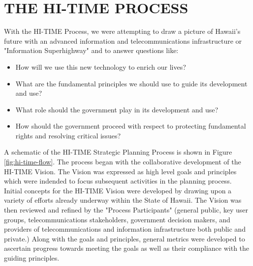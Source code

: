 
\section{THE HI-TIME PROCESS}


With the HI-TIME Process, we were attempting to draw a picture of 
Hawaii's future with an advanced information and telecommunications 
infrastructure or "Information Superhighway" and to answer questions 
like:

\begin{itemize}
\item How will we use this new technology to enrich our lives?

\item What are the fundamental principles we should use to guide its 
development and use?

\item What role should the government play in its development and use?

\item How should the government proceed with respect to protecting 
fundamental rights and resolving critical issues?

\end{itemize}

A schematic of the HI-TIME Strategic Planning Process is shown in Figure
\ref{fig:hi-time-flow}.  The process began with the collaborative
development of the HI-TIME Vision.  The Vision was expressed as high level
goals and principles which were indended to focus subsequent activities in the
planning process.  Initial concepts for the HI-TIME Vision were developed by
drawing upon a variety of efforts already underway within the State of
Hawaii.  The Vision was then reviewed and refined by the "Process
Participants" (general public, key user groups, telecommunications
stakeholders, government decision makers, and providers of
telecommunications and information infrastructure both public and private.)
Along with the goals and principles, general metrics were developed to
ascertain progress towards meeting the goals as well as their compliance
with the guiding principles.

